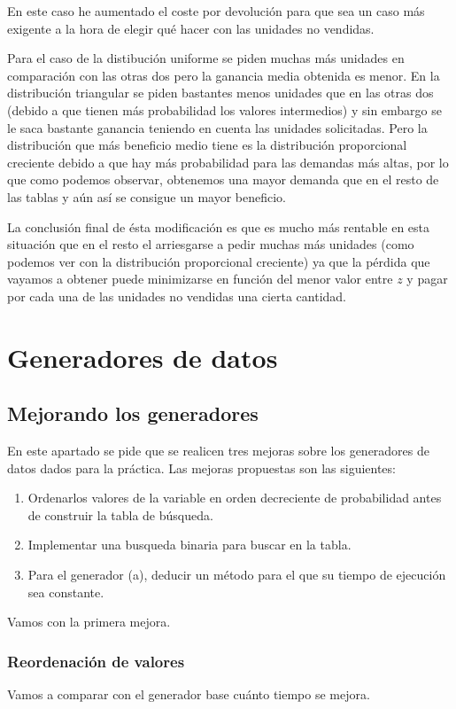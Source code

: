 \documentclass[11pt,a4paper]{report}
\begin{document}
En este caso he aumentado el coste por devolución para que sea un caso más exigente a la hora de elegir qué hacer con las unidades no vendidas. 

Para el caso de la distibución uniforme se piden muchas más unidades en comparación con las otras dos pero la ganancia media obtenida es menor. En la distribución triangular se piden bastantes menos unidades que en las otras dos (debido a que tienen más probabilidad los valores intermedios) y sin embargo se le saca bastante ganancia teniendo en cuenta las unidades solicitadas. Pero la distribución que más beneficio medio tiene es la distribución proporcional creciente debido a que hay más probabilidad para las demandas más altas, por lo que como podemos observar, obtenemos una mayor demanda que en el resto de las tablas y aún así se consigue un mayor beneficio.

La conclusión final de ésta modificación es que es mucho más rentable en esta situación que en el resto el arriesgarse a pedir muchas más unidades (como podemos ver con la distribución proporcional creciente) ya que la pérdida que vayamos a obtener puede minimizarse en función del menor valor entre $z$ y pagar por cada una de las unidades no vendidas una cierta cantidad.

\newpage

\chapter{Generadores de datos}
\newpage
\section{Mejorando los generadores}
En este apartado se pide que se realicen tres mejoras sobre los generadores de datos dados para la práctica. Las mejoras propuestas son las siguientes:
\begin{enumerate}
	\item{Ordenarlos valores de la variable en orden decreciente de probabilidad antes de construir la tabla de búsqueda.}
	\item{Implementar una busqueda binaria para buscar en la tabla.}
	\item{Para el generador (a), deducir un método para el que su tiempo de ejecución sea constante.}
\end{enumerate}

Vamos con la primera mejora.

\subsection{Reordenación de valores}
Vamos a comparar con el generador base cuánto tiempo se mejora.
\end{document}
